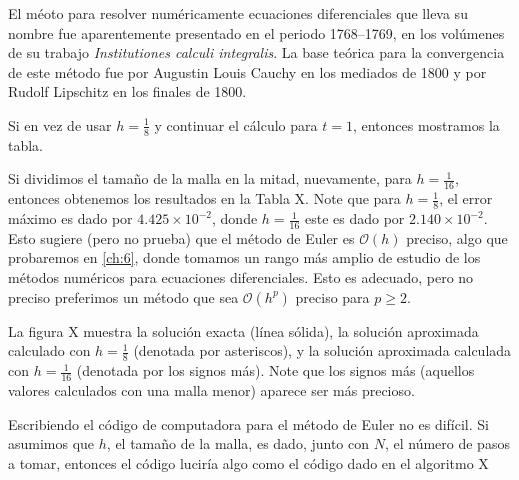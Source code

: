 {El méoto para resolver numéricamente ecuaciones diferenciales que lleva su nombre fue aparentemente presentado en el periodo 1768--1769, en los volúmenes de su trabajo \emph{Institutiones calculi integralis}. La base teórica para la convergencia de este método fue %
por Augustin Louis Cauchy en los mediados de 1800 y por Rudolf Lipschitz en los finales de 1800.
}

Si en vez de usar $h=\frac{1}{8}$ y continuar el cálculo para $t=1$, entonces mostramos la tabla.

Si dividimos el tamaño de la malla en la mitad, nuevamente, para $h=\frac{1}{16}$, entonces obtenemos los resultados en la Tabla X. Note que para $h=\frac{1}{8}$, el error máximo es dado por $4.425\times 10^{-2}$, donde $h=\frac{1}{16}$ este es dado por $2.140\times10^{-2}$. Esto sugiere (pero no prueba) que el método de Euler es $\mathcal{O}\left(h\right)$ preciso, algo que probaremos en \autoref{ch:6}, donde tomamos un rango más amplio de estudio de los métodos numéricos para ecuaciones diferenciales. Esto es adecuado, pero no preciso %
preferimos un método que sea $\mathcal{O}\left(h^{p}\right)$ preciso para $p\geq2.$

La figura X muestra la solución exacta (línea sólida), la solución aproximada calculado con $h=\frac{1}{8}$ (denotada por asteriscos), y la solución aproximada calculada con $h=\frac{1}{16}$ (denotada por los signos más). Note que los signos más (aquellos valores calculados con una malla menor) aparece ser más precioso.

Escribiendo el código de computadora para el método de Euler no es difícil. Si asumimos que $h$, el tamaño de la malla, es dado, junto con $N$, el número de pasos a tomar, entonces el código luciría algo como el código dado en el algoritmo X

\newpage

